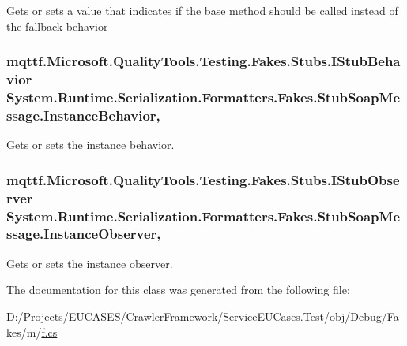 Gets or sets a value that indicates if the base method should be called instead of the fallback behavior

\hypertarget{class_system_1_1_runtime_1_1_serialization_1_1_formatters_1_1_fakes_1_1_stub_soap_message_a4906b2c499691f2f1cd2c96f9f8486f4}{
\subsubsection[{Instance\-Behavior}]{\setlength{\rightskip}{0pt plus 5cm}mqttf.\-Microsoft.\-Quality\-Tools.\-Testing.\-Fakes.\-Stubs.\-I\-Stub\-Behavior System.\-Runtime.\-Serialization.\-Formatters.\-Fakes.\-Stub\-Soap\-Message.\-Instance\-Behavior\hspace{0.3cm}{\ttfamily [get]}, {\ttfamily [set]}}}\label{class_system_1_1_runtime_1_1_serialization_1_1_formatters_1_1_fakes_1_1_stub_soap_message_a4906b2c499691f2f1cd2c96f9f8486f4}


Gets or sets the instance behavior.

\hypertarget{class_system_1_1_runtime_1_1_serialization_1_1_formatters_1_1_fakes_1_1_stub_soap_message_acc64d768e3c502c31bb7a45d3eadcc3f}{
\subsubsection[{Instance\-Observer}]{\setlength{\rightskip}{0pt plus 5cm}mqttf.\-Microsoft.\-Quality\-Tools.\-Testing.\-Fakes.\-Stubs.\-I\-Stub\-Observer System.\-Runtime.\-Serialization.\-Formatters.\-Fakes.\-Stub\-Soap\-Message.\-Instance\-Observer\hspace{0.3cm}{\ttfamily [get]}, {\ttfamily [set]}}}\label{class_system_1_1_runtime_1_1_serialization_1_1_formatters_1_1_fakes_1_1_stub_soap_message_acc64d768e3c502c31bb7a45d3eadcc3f}


Gets or sets the instance observer.



The documentation for this class was generated from the following file\-:\begin{DoxyCompactItemize}
\item 
D\-:/\-Projects/\-E\-U\-C\-A\-S\-E\-S/\-Crawler\-Framework/\-Service\-E\-U\-Cases.\-Test/obj/\-Debug/\-Fakes/m/\hyperlink{m_2f_8cs}{f.\-cs}\end{DoxyCompactItemize}
